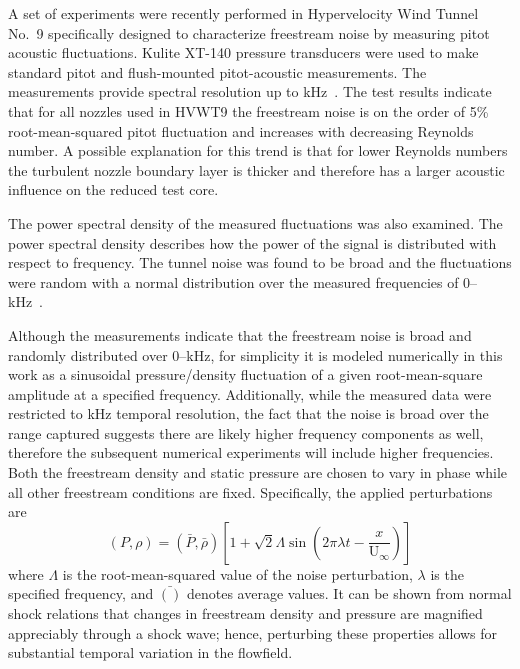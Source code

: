 A set of experiments were recently performed in Hypervelocity Wind Tunnel No.~9 specifically designed to characterize freestream noise by measuring pitot acoustic fluctuations.  Kulite XT-140 pressure transducers were used to make standard pitot and flush-mounted pitot-acoustic measurements.  The measurements provide spectral resolution up to \unit[25]{kHz}~\cite{lafferty_norris_AEDC_noise}.  The test results indicate that for all nozzles used in HVWT9 the freestream noise is on the order of 5\%  root-mean-squared pitot fluctuation and increases with decreasing Reynolds number.  A possible explanation for this trend is that for lower Reynolds numbers the turbulent nozzle boundary layer is thicker and therefore has a larger acoustic influence on the reduced test core.

The power spectral density of the measured fluctuations was also examined. The power spectral density describes how the power of the signal is distributed with respect to frequency.  The tunnel noise was found to be broad and the fluctuations were random with a normal distribution over the measured frequencies of 0--\unit[25]{kHz}~\cite{lafferty_norris_AEDC_noise}.

Although the measurements indicate that the freestream noise is broad and randomly distributed over 0--\unit[25]{kHz}, for simplicity it is modeled numerically in this work as a sinusoidal pressure/density fluctuation of a given root-mean-square amplitude at a specified frequency. Additionally, while the measured data were restricted to \unit[25]{kHz} temporal resolution, the fact that the noise is broad over the range captured suggests there are likely  higher frequency components as well, therefore the subsequent numerical experiments will include higher frequencies.  Both the freestream density and static pressure are chosen to vary in phase while all other freestream conditions are fixed.  Specifically, the applied perturbations are
\begin{equation}
  \left(P,\rho\right) = \left(\bar{P},\bar{\rho}\right)\left[1 + \sqrt{2}\Lambda\sin\left(2\pi\lambda t - \frac{x}{\text{U}_\infty}\right) \right]
\end{equation}
where $\Lambda$ is the root-mean-squared value of the noise perturbation, $\lambda$ is the specified frequency, and $\bar{()}$ denotes average values. It can be shown from normal shock relations that changes in freestream density and pressure are magnified appreciably through a shock wave; hence, perturbing these properties allows for substantial temporal variation in the flowfield.

